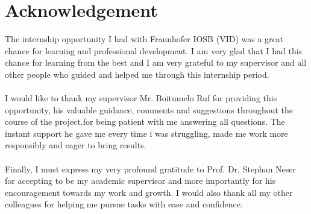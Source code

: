 \chapter*{Acknowledgement}
The internship opportunity I had with Fraunhofer IOSB (VID) was a great chance for learning and professional development. I am very glad that I had this chance for learning from the best and I am very grateful to my supervisor and all other people who guided and helped me through this internship period.\\
\\
I would like to thank my supervisor Mr. Boitumelo Ruf for providing this opportunity, his valuable guidance, comments and suggestions throughout the course of the project.for being patient with me answering all questions. The instant support he gave me every time i was struggling, made me work more responsibly and eager to bring results.\\ 
\\
Finally, I must express my very profound gratitude to Prof. Dr. Stephan Neser for accepting to be my academic supervisor and more importantly for his encouragement towards my work and growth. I would also thank all my other colleagues for helping me pursue tasks with ease and confidence.\\